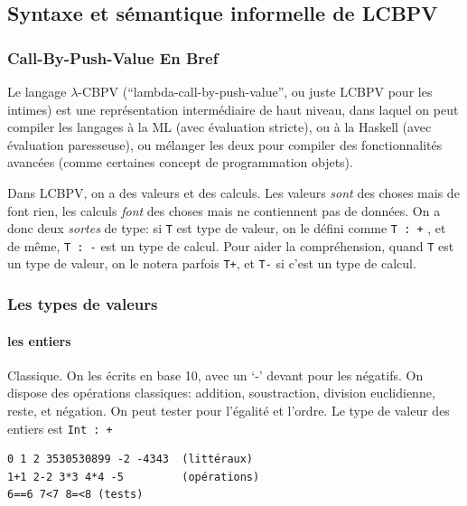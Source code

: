 \documentclass[12pt]{article}
\begin{document}
\hypertarget{syntaxe-et-suxe9mantique-informelle-de-ux3bb-cbpv}{%
      \subsection*{Syntaxe et sémantique informelle de
            LCBPV}\label{syntaxe-et-suxe9mantique-informelle-de-ux3bb-cbpv}}

\hypertarget{call-by-push-value-en-bref}{%
      \subsubsection*{Call-By-Push-Value En
            Bref}\label{call-by-push-value-en-bref}}

Le langage $\lambda$-CBPV (``lambda-call-by-push-value'', ou juste LCBPV pour
les intimes) est une représentation intermédiaire de haut niveau, dans
laquel on peut compiler les langages à la ML (avec évaluation stricte),
ou à la Haskell (avec évaluation paresseuse), ou mélanger les deux pour
compiler des fonctionnalités avancées (comme certaines concept de
programmation objets).

Dans LCBPV, on a des valeurs et des calculs. Les valeurs \emph{sont} des
choses mais de font rien, les calculs \emph{font} des choses mais ne
contiennent pas de données. On a donc deux \emph{sortes} de type: si
\texttt{T} est type de valeur, on le défini comme \texttt{T\ :\ +} , et
de même, \texttt{T\ :\ -} est un type de calcul. Pour aider la
compréhension, quand \texttt{T} est un type de valeur, on le notera
parfois \texttt{T+}, et \texttt{T-} si c'est un type de calcul.

\hypertarget{les-types-de-valeurs}{%
      \subsubsection*{Les types de valeurs}\label{les-types-de-valeurs}}

\hypertarget{les-entiers}{%
      \paragraph*{les entiers}\label{les-entiers}}

Classique. On les écrits en base 10, avec un `-' devant pour les
négatifs. On dispose des opérations classiques: addition, soustraction,
division euclidienne, reste, et négation. On peut tester pour l'égalité
et l'ordre. Le type de valeur des entiers est \texttt{Int\ :\ +}

\begin{verbatim}
0 1 2 3530530899 -2 -4343  (littéraux)
1+1 2-2 3*3 4*4 -5         (opérations)
6==6 7<7 8=<8 (tests)
\end{verbatim}
\end{document}
